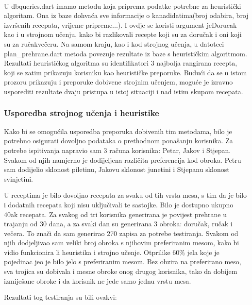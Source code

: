 \documentclass[diplomskirad]{fer}
\begin{document}
\\ 
U dbqueries.dart imamo metodu koja priprema podatke potrebne za heuristički algoritam. Ona iz baze dohvaća sve informacije o kanadidatima(broj odabira, broj izvršenih recepata, vrijeme pripreme...). I ovdje se koristi argument jeDorucak kao i u strojnom učenju, kako bi razlikovali recepte koji su za doručak i oni koji su za ručak\/večeru. Na samom kraju, kao i kod strojnog učenja, u datoteci plan\_prehrane.dart metoda povezuje rezultate iz baze s heurističkim algoritmom. Rezultati heurističkog algoritma su identifikatori 3 najbolja rangirana recepta, koji se zatim prikazuju korisniku kao heurističke preporuke. Budući da se u istom prozoru prikazuju i preporuke dobivene strojnim učenjem, moguće je izravno usporediti rezultate dvaju pristupa u istoj situaciji i nad istim skupom recepata.

\subsubsection{Usporedba strojnog učenja i heuristike}

Kako bi se omogućila usporedba preporuka dobivenih tim metodama, bilo je potrebno osigurati dovoljno podataka o prethodnom ponašanju korisnika. Za potrebe ispitivanja napravio sam 3 računa korisnika: Petar, Jakov i Stjepan. Svakom od njih namjerno je dodijeljena različita preferencija kod obroka. Petru sam dodijelio sklonost piletinu, Jakovu sklonost junetini i Stjepanu sklonost svinjetini.

U receptima je bilo dovoljno recepata za svaku od tih vrsta mesa, s tim da je bilo i dodatnih recepata koji nisu uključivali te sastojke. Bilo je dostupno ukupno 40ak recepata. Za svakog od tri korisnika generirana je povijest prehrane u trajanju od 30 dana, a za svaki dan su generirana 3 obroka: doručak, ručak i večera. To znači da sam generirao 270 zapisa za potrebe testiranja. Svakom od njih dodjeljivao sam veliki broj obroka s njihovim preferiranim mesom, kako bi vidio funkcionira li heuristika i strojno učenje. Otprilike 60\% jela koje   je pojedinac jeo je bilo jelo s preferiranim mesom. Bez obzira na preferirano meso, sva trojica su dobivala i mesne obroke onog drugog korisnika, tako da dobijem izmiješane obroke i da korisnik ne jede samo jednu vrstu mesa. 

Rezultati tog testiranja su bili ovakvi: 
\end{document}
